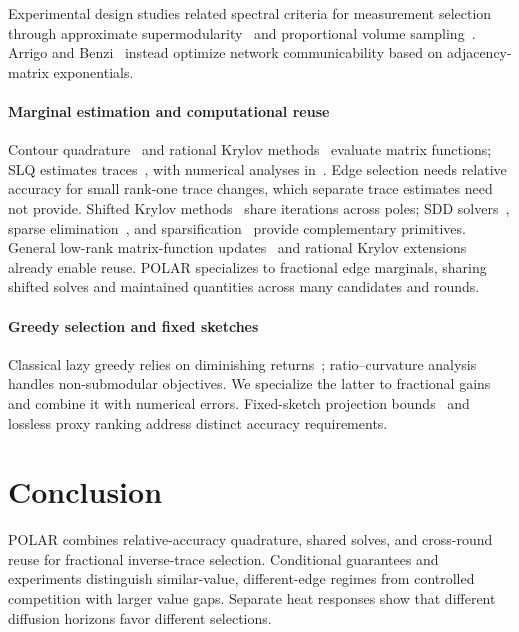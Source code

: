\documentclass[conference]{IEEEtran}
\theoremstyle{definition}
\newcommand{\POLAR}{\textsc{POLAR}}
\begin{document}
Experimental design studies related spectral criteria for
measurement selection through
approximate supermodularity~\cite{chamon2017} and proportional
volume sampling~\cite{nikolov2019}. Arrigo and Benzi~\cite{arrigo2016} instead optimize
network communicability based on adjacency-matrix exponentials.

\paragraph{Marginal estimation and computational reuse}
Contour quadrature~\cite{hale2008} and rational Krylov
methods~\cite{benzi2022} evaluate matrix functions; SLQ estimates
traces~\cite{ubaru2017}, with numerical analyses in~\cite{musco2018,chen2022}.
Edge selection needs relative accuracy for small rank-one trace changes,
which separate trace estimates need not provide. Shifted Krylov
methods~\cite{jegerlehner1996,frommer1998} share iterations across poles;
SDD solvers~\cite{spielman2014solver,koutis2011}, sparse
elimination~\cite{kyng2016}, and sparsification~\cite{spielman2011,batson2012}
provide complementary primitives. General low-rank matrix-function
updates~\cite{beckermann2018} and rational Krylov
extensions~\cite{beckermann2021} already enable reuse.
\POLAR{} specializes to fractional edge marginals, sharing shifted
solves and maintained quantities across many candidates and rounds.

\paragraph{Greedy selection and fixed sketches}
Classical lazy greedy relies on diminishing returns~\cite{leskovec2007};
ratio--curvature analysis~\cite{bian2017} handles non-submodular
objectives. We specialize the latter to fractional gains and combine
it with numerical errors. Fixed-sketch projection
bounds~\cite{skorski2021} and lossless proxy ranking address distinct
accuracy requirements.

\section{Conclusion}
\label{sec:conclusion}
\POLAR{} combines relative-accuracy quadrature, shared solves, and
cross-round reuse for fractional inverse-trace selection. Conditional
guarantees and experiments distinguish similar-value, different-edge
regimes from controlled competition with larger value gaps.
Separate heat responses show that different diffusion horizons
favor different selections.
\end{document}
